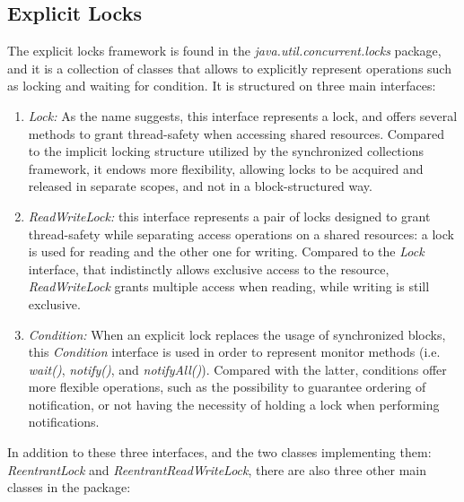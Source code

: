 \documentclass[]{usiinfthesis}
\begin{document}
\subsection{Explicit Locks}
The explicit locks framework is found in the \textit{java.util.concurrent.locks} package, and it is a collection of classes that allows to explicitly represent operations such as locking and waiting for condition. It is structured on three main interfaces:
\begin{enumerate}
    \item \textit{Lock:} As the name suggests, this interface represents a lock, and offers several methods to grant thread-safety when accessing shared resources. Compared to the implicit locking structure utilized by the synchronized collections framework, it endows more flexibility, allowing locks to be acquired and released in separate scopes, and not in a block-structured way.  
    \item \textit{ReadWriteLock:} this interface represents a pair of locks designed to grant thread-safety while separating access operations on a shared resources: a lock is used for reading and the other one for writing. Compared to the \textit{Lock} interface, that indistinctly allows exclusive access to the resource, \textit{ReadWriteLock} grants multiple access when reading, while writing is still exclusive.
    \item \textit{Condition:} When an explicit lock replaces the usage of synchronized blocks, this \textit{Condition} interface is used in order to represent monitor methods (i.e. \textit{wait()}, \textit{notify()}, and \textit{notifyAll()}). Compared with the latter, conditions offer more flexible operations, such as the possibility to guarantee ordering of notification, or not having the necessity of holding a lock when performing notifications.
\end{enumerate}

\noindent
In addition to these three interfaces, and the two classes implementing them: \textit{ReentrantLock} and \textit{ReentrantReadWriteLock}, there are also three other main classes in the package:
\end{document}

